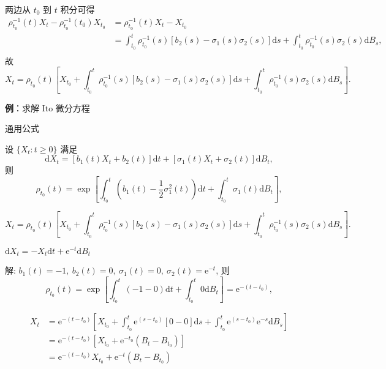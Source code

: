 \documentclass[openany]{ctexbook}
\theoremstyle{kaiti}
\theoremstyle{normal}
\begin{document}
两边从 $t_0$ 到 $t$ 积分可得
\begin{equation}
  \begin{aligned}
    \rho_{t_0}^{-1}(t)X_t-\rho_{t_0}^{-1}(t_0)X_{t_0}
    &=\rho_{t_0}^{-1}(t)X_t-X_{t_0}\\
    &=\int_{t_0}^t\rho_{t_0}^{-1}(s)[b_2(s)-\sigma_1(s)\sigma_2(s)]\mathrm{d}s+\int_{t_0}^t\rho_{t_0}^{-1}(s)\sigma_2(s)\mathrm{d}B_s,\\
  \end{aligned}
\end{equation}
故
\begin{equation}
  X_t=\rho_{t_0}(t)\left[X_{t_0}+\int_{t_0}^t\rho_{t_0}^{-1}(s)[b_2(s)-\sigma_1(s)\sigma_2(s)]\mathrm{d}s+\int_{t_0}^t\rho_{t_0}^{-1}(s)\sigma_2(s)\mathrm{d}B_s\right].
\end{equation}

\textbf{例}：求解 Ito 微分方程

通用公式

设 $\{X_t:t\geqslant0\}$ 满足
\begin{equation}
  \mathrm{d}X_t=[b_1(t) X_t+b_2(t)]\mathrm{d}t+[\sigma_1(t) X_t+\sigma_2(t)]\mathrm{d}B_t,
\end{equation}
则
\begin{equation}
  \rho_{t_0}(t)=\exp\left[\int_{t_0}^t\left(b_1(t)-\frac{1}{2}\sigma_1^2(t)\right)\mathrm{d}t+\int_{t_0}^t\sigma_1(t) \mathrm{d}B_t\right],
\end{equation}

\begin{equation}
  X_t=\rho_{t_0}(t)\left[X_{t_0}+\int_{t_0}^t\rho_{t_0}^{-1}(s)[b_2(s)-\sigma_1(s)\sigma_2(s)]\mathrm{d}s+\int_{t_0}^t\rho_{t_0}^{-1}(s)\sigma_2(s)\mathrm{d}B_s\right].
\end{equation}

$\mathrm{d}X_t=-X_t\mathrm{d}t+\mathrm{e}^{-t}\mathrm{d}B_t$

解: $b_1(t)=-1,~b_2(t)=0,~\sigma_1(t)=0,~\sigma_2(t)=\mathrm{e}^{-t}$, 则
\begin{equation}
  \rho_{t_0}(t)=\exp\left[\int_{t_0}^t\left(-1-0\right)\mathrm{d}t+\int_{t_0}^t0 \mathrm{d}B_t\right]=\mathrm{e}^{-(t-t_0)},
\end{equation}

\begin{equation}
  \begin{aligned}
    X_t
    &=\mathrm{e}^{-(t-t_0)}\left[X_{t_0}+\int_{t_0}^t\mathrm{e}^{(s-t_0)}[0-0]\mathrm{d}s+\int_{t_0}^t\mathrm{e}^{(s-t_0)}\mathrm{e}^{-s}\mathrm{d}B_s\right]\\
    &=\mathrm{e}^{-(t-t_0)}\left[X_{t_0}+\mathrm{e}^{-t_0}(B_t-B_{t_0})\right]\\
    &=\mathrm{e}^{-(t-t_0)}X_{t_0}+\mathrm{e}^{-t}(B_t-B_{t_0})\\
  \end{aligned}
\end{equation}
\end{document}
